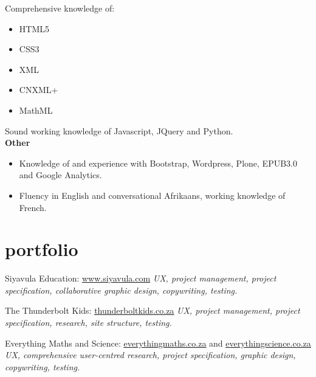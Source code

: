 \documentclass[]{friggeri-cv} %
\begin{document}
Comprehensive knowledge of: 
\begin{itemize}
 \item HTML5
 \item CSS3
 \item XML
 \item CNXML+
 \item MathML
 \end{itemize}
Sound working knowledge of Javascript, JQuery and Python.\\

\textbf{Other}
\begin{itemize}
\item Knowledge of and experience with Bootstrap, Wordpress, Plone, EPUB3.0 and Google Analytics.
 \item Fluency in English and conversational Afrikaans, working knowledge of French.
 
\end{itemize}



\section{portfolio}
\begin{sitelist}

\site
{}
{Siyavula Education: \href{https://web.archive.org/web/20140723153945/http://www.siyavula.com}{\underline{www.siyavula.com}}}
{}
{\emph{UX, project management, project specification, collaborative graphic design, copywriting, testing.}}


\site
{}
{The Thunderbolt Kids: \href{http://thunderboltkids.co.za}{\underline{thunderboltkids.co.za}}}
{}
{\emph{UX, project management, project specification, research, site structure, testing.}}

\site
{}
{Everything Maths and Science: \href{http://www.everythingmaths.co.za}{\underline{everythingmaths.co.za}} and \href{http://www.everythingmaths.co.za}{\underline{everythingscience.co.za}}}
{}
{\emph{UX, comprehensive user-centred research, project specification, graphic design, copywriting, testing.}}


\end{sitelist}
\end{document}
